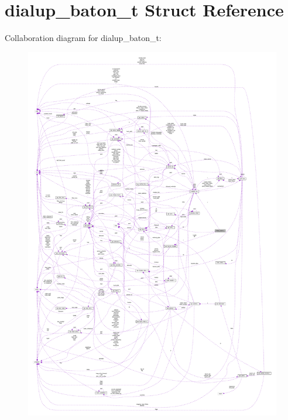 \hypertarget{structdialup__baton__t}{}\section{dialup\+\_\+baton\+\_\+t Struct Reference}
\label{structdialup__baton__t}


Collaboration diagram for dialup\+\_\+baton\+\_\+t\+:
\nopagebreak
\begin{figure}[H]
\begin{center}
\leavevmode
\includegraphics[width=350pt]{structdialup__baton__t__coll__graph}
\end{center}
\end{figure}
